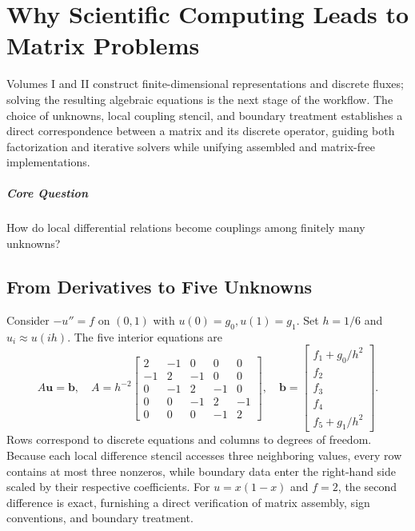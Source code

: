 \chapter{Why Scientific Computing Leads to Matrix Problems}\label{v0ch:1}
\begin{chaptersummary}
Volumes I and II construct finite-dimensional representations and discrete fluxes; solving the resulting algebraic equations is the next stage of the workflow. The choice of unknowns, local coupling stencil, and boundary treatment establishes a direct correspondence between a matrix and its discrete operator, guiding both factorization and iterative solvers while unifying assembled and matrix-free implementations.
\end{chaptersummary}
\paragraph{Core Question}How do local differential relations become couplings among finitely many unknowns?

\section{From Derivatives to Five Unknowns}
Consider $-u''=f$ on $(0,1)$ with $u(0)=g_0,u(1)=g_1$. Set $h=1/6$ and $u_i\approx u(ih)$. The five interior equations are
\[
 A\bm u=\bm b,\quad
 A=h^{-2}\begin{bmatrix}
 2&-1&0&0&0\\-1&2&-1&0&0\\0&-1&2&-1&0\\
 0&0&-1&2&-1\\0&0&0&-1&2
 \end{bmatrix},\quad
 \bm b=\begin{bmatrix}f_1+g_0/h^2\\f_2\\f_3\\f_4\\f_5+g_1/h^2\end{bmatrix}.
\]
Rows correspond to discrete equations and columns to degrees of freedom. Because each local difference stencil accesses three neighboring values, every row contains at most three nonzeros, while boundary data enter the right-hand side scaled by their respective coefficients. For $u=x(1-x)$ and $f=2$, the second difference is exact, furnishing a direct verification of matrix assembly, sign conventions, and boundary treatment.
